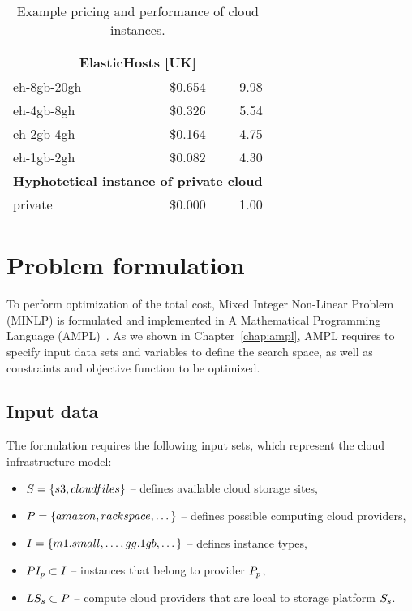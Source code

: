 {\begin{table}
\begin{tabular}{| l | r | r |}
    \multicolumn{3}{|c|}{\textbf{ElasticHosts [UK]}}                         \\ \hline
    eh-8gb-20gh       & \$0.654   & 9.98                                     \\ \hline
    eh-4gb-8gh        & \$0.326   & 5.54                                     \\ \hline
    eh-2gb-4gh        & \$0.164   & 4.75                                     \\ \hline
    eh-1gb-2gh        & \$0.082   & 4.30                                     \\ \hline
    \multicolumn{3}{|c|}{\textbf{Hyphotetical instance of private cloud}}    \\ \hline
    private           & \$0.000   & 1.00                                     \\ \hline
  \end{tabular}
  \caption{Example pricing and performance of cloud instances.}
  \label{table:intro:cloud:pricing}  
\end{table}


\section{Problem formulation}
\label{sec:bot:problem}

  To perform optimization of the total cost, Mixed Integer Non-Linear Problem (MINLP) is formulated and implemented in A Mathematical Programming Language (AMPL)~\cite{Fourer2002}.  As we shown in Chapter~\ref{chap:ampl}, AMPL requires to specify input data sets and variables to define the search space, as well as constraints and objective function to be optimized.

\subsection{Input data}
 
  The formulation requires the following input sets, which represent the cloud infrastructure model:
  \begin{itemize}
      \item $S = \{s3, cloudfiles\}$ -- defines available cloud storage
      sites,
      \item $P = \{amazon, rackspace, \dotsc\}$ -- defines
      possible computing cloud providers,
      \item $I = \{m1.small, \dots, gg.1gb, \dotsc\}$ -- defines
      instance types,
      \item $PI_{p} \subset I$ -- instances that
      belong to provider $P_p$,
      \item $LS_{s} \subset P$ -- compute cloud providers
      that are local to storage platform $S_s$.
  \end{itemize}        
    
}
